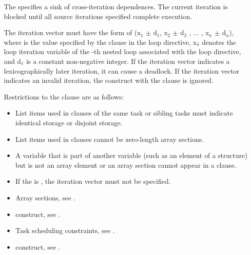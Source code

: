 The   specifies a sink of cross-iteration dependences. The current iteration is blocked until all source iterations specified complete execution.

The iteration vector  must have the form of 
(x$_{1}$ $\pm $ d$_{1}$, x$_{2}$ $\pm $ d$_{2}$ , ... , x$_{n}$ $\pm $ d$_{n}$), 
where  is the value specified by the  clause in the loop directive, 
x$_{{\textrm{\textmd{\itshape{i}}}}}$ denotes the loop iteration variable of the -th nested loop associated with the loop directive, and 
d$_{{\textrm{\textmd{\itshape{i}}}}}$ is a constant non-negative integer. 
If the iteration vector  indicates a lexicographically later iteration, it can cause a deadlock. If the iteration vector  indicates an invalid iteration, the  construct with the  clause is ignored.


\restrictions
Restrictions to the  clause are as follows:

\begin{itemize}
\item List items used in  clauses of the same task or sibling tasks must indicate 
identical storage or disjoint storage. 

\item List items used in  clauses cannot be zero-length array sections. 

\item A variable that is part of another variable (such as an element of a structure) but is not an 
array element or an array section cannot appear in a  clause.

\item If the  is , the iteration vector  must not be specified.  
\end{itemize}

\crossreferences
\begin{itemize}
\item Array sections, see
.

\item {} construct, see 
.

\item Task scheduling constraints, see
. 

\item {} construct, see
. 
\end{itemize}







